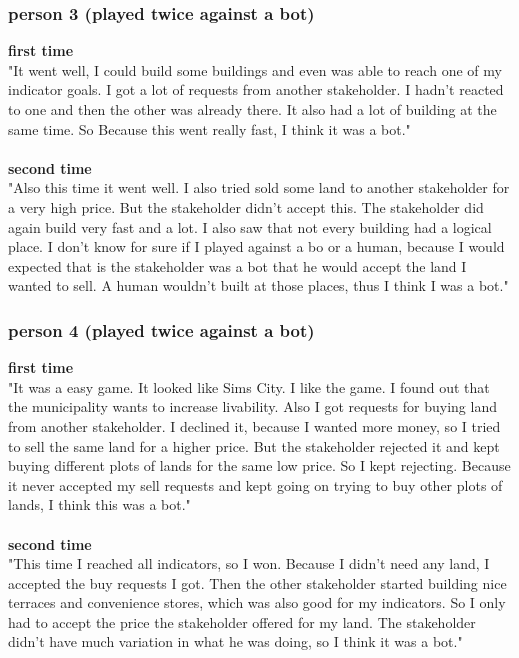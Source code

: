 \subsubsection{person 3 (played twice against a bot)}
\textbf{first time}\\
"It went well, I could build some buildings and even was able to reach one of my indicator goals. I got a lot of requests from another stakeholder. I hadn't reacted to one and then the other was already there. It also had a lot of building at the same time. So Because this went really fast, I think it was a bot."
\\ \\
\textbf{second time}\\
"Also this time it went well. I also tried sold some land to another stakeholder for a very high price. But the stakeholder didn't accept this. The stakeholder did again build very fast and a lot. I also saw that not every building had a logical place. I don't know for sure if I played against a bo or a human, because I would expected that is the stakeholder was a bot that he would accept the land I wanted to sell. A human wouldn't built at those places, thus I think I was a bot." 

\subsubsection{person 4 (played twice against a bot)}
 \textbf{first time}\\
 "It was a easy game. It looked like Sims City. I like the game. I found out that the municipality wants to increase livability. Also I got requests for buying land from another stakeholder. I declined it, because I wanted more money, so I tried to sell the same land for a higher price. But the stakeholder rejected it and kept buying different plots of lands for the same low price. So I kept rejecting. Because it never accepted my sell requests and kept going on trying to buy other plots of lands, I think this was a bot." 
 \\ \\
 \textbf{second time}\\
 "This time I reached all indicators, so I won. Because I didn't need any land, I accepted the buy requests I got. Then the other stakeholder started building nice terraces and convenience stores, which was also good for my indicators. So I only had to accept the price the stakeholder offered for my land. The stakeholder didn't have much variation in what he was doing, so I think it was a bot."

